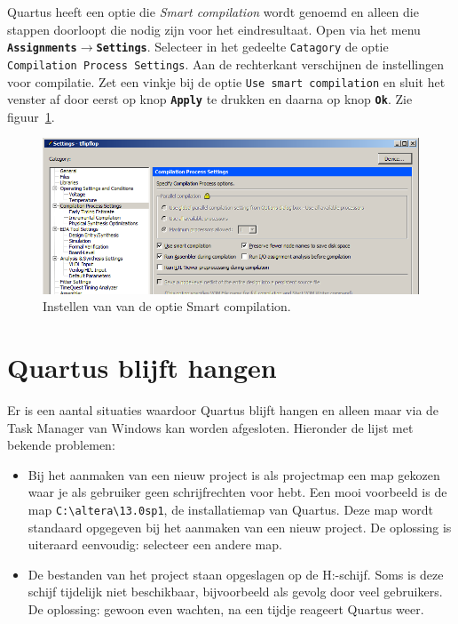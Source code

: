 \documentclass[a4paper,12pt,fleqn,twoside]{book}
\def\tutpicscale{0.455}
\newcommand{\menu}[1]{\texttt{\textbf{#1}}}
\newcommand{\knop}[1]{\texttt{\textbf{#1}}}
\newcommand{\naam}[1]{\texttt{#1}}
\def\pijl{$\rightarrow$}%
\begin{document}
Quartus heeft een optie die \textsl{Smart compilation} wordt genoemd en
alleen die stappen doorloopt die nodig zijn voor het eindresultaat. Open via
het menu \menu{Assignments\pijl{}Settings}. Selecteer in het gedeelte
\naam{Catagory} de optie \naam{Compilation Process Settings}. Aan de 
rechterkant verschijnen de instellingen voor compilatie. Zet een vinkje
bij de optie \naam{Use smart compilation} en sluit het venster af
door eerst op knop \knop{Apply} te drukken en daarna op knop \knop{Ok}.
Zie figuur~\ref{fig:225smartcompilation}.

\begin{figure}[H]
\centering
\includegraphics[scale=\tutpicscale]{225smartcompilation.png}
\caption{Instellen van van de optie Smart compilation.}
\label{fig:225smartcompilation}
\end{figure}


\section{Quartus blijft hangen}
\label{sec:quartusblijfthangen}
Er is een aantal situaties waardoor Quartus blijft hangen en alleen maar
via de Task Manager van Windows kan worden afgesloten. Hieronder de lijst met
bekende problemen:

\begin{itemize}\itemsep-1pt
\item Bij het aanmaken van een nieuw project is als projectmap een map gekozen
      waar je als gebruiker geen schrijfrechten voor hebt. Een mooi voorbeeld
      is de map \lstinline|C:\altera\13.0sp1|, de installatiemap van Quartus.
      Deze map wordt standaard opgegeven bij het aanmaken van een nieuw
      project. De oplossing is uiteraard eenvoudig: selecteer een andere map.
\item De bestanden van het project staan opgeslagen op de H:-schijf. Soms is
      deze schijf tijdelijk niet beschikbaar, bijvoorbeeld als gevolg door
      veel gebruikers. De oplossing: gewoon even wachten, na een tijdje
      reageert Quartus weer.
\end{itemize}
\end{document}
